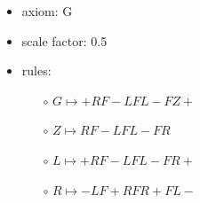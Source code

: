 \documentclass{article}
\begin{document}
\begin{itemize}
  \item axiom: G
  \item scale factor: 0.5
  \item rules: \begin{itemize}
      \item[$\circ$] $G \mapsto +RF-LFL-FZ+ $
      \item[$\circ$] $Z \mapsto RF-LFL-FR $
      \item[$\circ$] $L \mapsto +RF-LFL-FR+ $
      \item[$\circ$] $R \mapsto -LF+RFR+FL- $
  \end{itemize}
\end{itemize}

\end{document}
